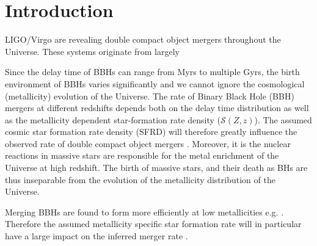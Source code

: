 \documentclass[twocolumn]{aastex631}
\newcommand{\SFRDzZ}{\ensuremath{\mathcal{S}(Z,z)}\xspace}
\begin{document}
\section{Introduction \label{sec: intro}}

LIGO/Virgo are revealing double compact object mergers throughout the Universe. These systems originate from largely




Since the delay time of BBHs can range from Myrs to multiple Gyrs, the birth environment of BBHs varies significantly and we cannot ignore the cosmological (metallicity) evolution of the Universe. 
The rate of Binary Black Hole (BBH) mergers at different redshifts depends both on the delay time distribution as well as the metallicity dependent star-formation rate density (\SFRDzZ).
The assumed cosmic star formation rate density (SFRD) will therefore greatly influence the observed rate of double compact object mergers \citep{Neijssel+2019, Chruslinska2019_obs, Boco2020,Broekgaarden+2021a}. 
Moreover, it is the nuclear reactions in massive stars are responsible for the metal enrichment of the Universe at high redshift. The birth of massive stars, and their death as BHs are thus inseparable from the evolution of the metallicity distribution of the Universe. 

Merging BBHs are found to form more efficiently at low metallicities e.g. \citep[e.g.][]{BelczynskiVink2010, Stevenson+2017,Mapelli2017,Chruslinska2019_effectCO}. Therefore the assumed metallicity specific star formation rate will in particular have a large impact on the inferred merger rate \citep[e.g.][]{Chruslinska2019_obs,Chruslinska2019_effectCO, Neijssel2019, Broekgaarden+2021a}.
\end{document}
